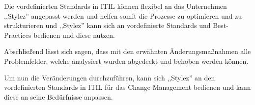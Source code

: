 Die vordefinierten Standards in ITIL können flexibel an das
Unternehmen ,,Stylez'' angepasst werden und helfen somit die Prozesse
zu optimieren und zu strukturieren und ,,Stylez'' kann sich an
vordefinierte Standards und Best-Practices bedienen und diese nutzen.

Abschließend lässt sich sagen, dass mit den erwähnten
Änderungsmaßnahmen alle Problemfelder, welche analysiert wurden
abgedeckt und behoben werden können.

Um nun die Veränderungen durchzuführen, kann sich ,,Stylez'' an den
vordefinierten Standards in ITIL für das Change Management bedienen
und kann diese an seine Bedürfnisse anpassen.
